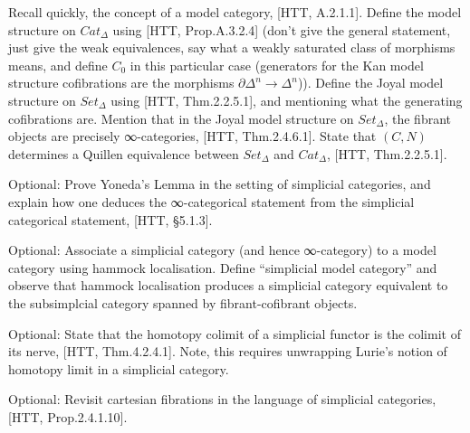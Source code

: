 \documentclass[a4paper]{amsart}
\numberwithin{figure}{section}
\theoremstyle{theorem}
\theoremstyle{definition}
\begin{document}

Recall quickly, the concept of a model category, [HTT, A.2.1.1]. %
Define the model structure on $Cat_{\Delta}$ using [HTT, Prop.A.3.2.4] (don't give the general statement, just give the weak equivalences, say what a weakly saturated class of morphisms means, and define $C_0$ in this particular case (generators for the Kan model structure cofibrations are the morphisms $\partial \Delta^n \to \Delta^n$)). %
Define the Joyal model structure on $Set_\Delta$ using [HTT, Thm.2.2.5.1], and mentioning what the generating cofibrations are. %
Mention that in the Joyal model structure on $Set_\Delta$, the fibrant objects are precisely ∞-categories, [HTT, Thm.2.4.6.1]. %
State that $(C, N)$ determines a Quillen equivalence between $Set_\Delta$ and $Cat_\Delta$, [HTT, Thm.2.2.5.1]. 

Optional: Prove Yoneda's Lemma in the setting of simplicial categories, and explain how one deduces the ∞-categorical statement from the simplicial categorical statement, [HTT, §5.1.3].

Optional: Associate a simplicial category (and hence ∞-category) to a model category using hammock localisation. Define ``simplicial model category'' and observe that hammock localisation produces a simplicial category equivalent to the subsimplcial category spanned by fibrant-cofibrant objects.

Optional: State that the homotopy colimit of a simplicial functor is the colimit of its nerve, [HTT, Thm.4.2.4.1]. %
Note, this requires unwrapping Lurie's notion of homotopy limit in a simplicial category. 

Optional: Revisit cartesian fibrations in the language of simplicial categories, [HTT, Prop.2.4.1.10]. 
\end{document}
